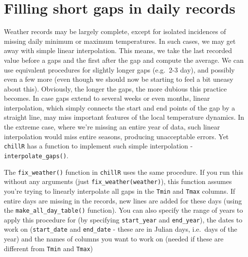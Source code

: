 \documentclass[
]{book}
\newenvironment{Shaded}{\begin{snugshade}}{\end{snugshade}}
\newcommand{\KeywordTok}[1]{\textcolor[rgb]{0.13,0.29,0.53}{\textbf{#1}}}
\newcommand{\NormalTok}[1]{#1}
\newcommand{\OperatorTok}[1]{\textcolor[rgb]{0.81,0.36,0.00}{\textbf{#1}}}
\newcommand{\StringTok}[1]{\textcolor[rgb]{0.31,0.60,0.02}{#1}}
\begin{document}
\hypertarget{filling-short-gaps-in-daily-records}{%
\section{Filling short gaps in daily records}\label{filling-short-gaps-in-daily-records}}

Weather records may be largely complete, except for isolated incidences of missing daily minimum or maximum temperatures. In such cases, we may get away with simple linear interpolation. This means, we take the last recorded value before a gaps and the first after the gap and compute the average. We can use equivalent procedures for slightly longer gaps (e.g.~2-3 day), and possibly even a few more (even though we should now be starting to feel a bit uneasy about this). Obviously, the longer the gaps, the more dubious this practice becomes. In case gaps extend to several weeks or even months, linear interpolation, which simply connects the start and end points of the gap by a straight line, may miss important features of the local temperature dynamics. In the extreme case, where we're missing an entire year of data, such linear interpolation would miss entire seasons, producing unacceptable errors. Yet \texttt{chillR} has a function to implement such simple interpolation - \texttt{interpolate\_gaps()}.

\begin{Shaded}
\end{Shaded}

The \texttt{fix\_weather()} function in \texttt{chillR} uses the same procedure. If you run this without any arguments (just \texttt{fix\_weather(weather)}), this function assumes you're trying to linearly interpolate all gaps in the \texttt{Tmin} and \texttt{Tmax} columns. If entire days are missing in the records, new lines are added for these days (using the \texttt{make\_all\_day\_table()} function). You can also specify the range of years to apply this procedure for (by specifying \texttt{start\_year} and \texttt{end\_year}), the dates to work on (\texttt{start\_date} and \texttt{end\_date} - these are in Julian days, i.e.~days of the year) and the names of columns you want to work on (needed if these are different from \texttt{Tmin} and \texttt{Tmax})
\end{document}
